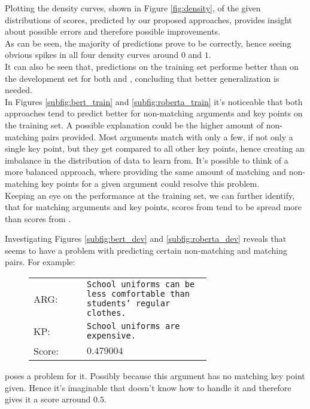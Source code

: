 Plotting the density curves, shown in Figure \ref{fig:density}, of the given distributions of scores, predicted by our proposed approaches, provides 
insight about possible errors and therefore possible improvements.\\
As can be seen, the majority of predictions prove to be correctly, hence seeing obvious spikes in all four density
curves around $0$ and $1$.\\
It can also be seen that, predictions on the training set performe better than on the development set for both 
\Roberta and \Bert, concluding that better generalization is needed.\\
In Figures \ref{subfig:bert_train} and \ref{subfig:roberta_train} it's noticeable that
both approaches tend to predict better for non-matching arguments and key points on the training set. A possible explanation 
could be the higher amount of non-matching pairs provided. Most arguments match with only a few, if 
not only a single key point, but they get compared to all other key points, hence creating an imbalance in the distribution 
of data to learn from. It's possible to think of a more balanced approach, where providing the same amount of matching and 
non-matching key points for a given argument could resolve this problem.\\
Keeping an eye on the performance at the training set, we can further identify, that for matching arguments and key points, 
scores from \Bert tend to be spread more than scores from \Roberta.

Investigating Figures \ref{subfig:bert_dev} and \ref{subfig:roberta_dev} reveals that \Bert seems to have a problem with 
predicting certain non-matching and matching pairs. For example: \\

\begin{figure}[H]
    \begin{tabularx}{\linewidth}{lp{0.7\linewidth}}
            ARG: & \texttt{School uniforms can be less comfortable than students' regular clothes.}\\
            KP: & \texttt{School uniforms are expensive.}\\
            Score:& $0.479004$\\
    \end{tabularx}
\end{figure}

poses a problem for it. Possibly because this argument has no matching key point given. Hence it's imaginable that 
\Bert doesn't know how to handle it and therefore gives it a score arround $0.5$.

